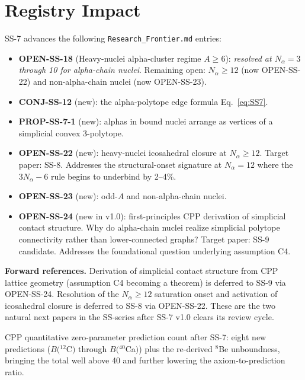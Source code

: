 \documentclass[11pt,letterpaper]{article}
\newcommand{\Nalpha}{N_{\alpha}}
\begin{document}
\section{Registry Impact}
\label{sec:registry}

SS-7 advances the following \texttt{Research\_Frontier.md} entries:
\begin{itemize}
\item \textbf{OPEN-SS-18} (Heavy-nuclei alpha-cluster regime $A \geq 6$): \emph{resolved at $\Nalpha = 3$ through 10 for alpha-chain nuclei}. Remaining open: $\Nalpha \geq 12$ (now OPEN-SS-22) and non-alpha-chain nuclei (now OPEN-SS-23).
\item \textbf{CONJ-SS-12} (new): the alpha-polytope edge formula Eq.~\ref{eq:SS7}.
\item \textbf{PROP-SS-7-1} (new): alphas in bound nuclei arrange as vertices of a simplicial convex 3-polytope.
\item \textbf{OPEN-SS-22} (new): heavy-nuclei icosahedral closure at $\Nalpha \geq 12$. Target paper: SS-8. Addresses the structural-onset signature at $\Nalpha = 12$ where the $3\Nalpha - 6$ rule begins to underbind by 2--4\%.
\item \textbf{OPEN-SS-23} (new): odd-$A$ and non-alpha-chain nuclei.
\item \textbf{OPEN-SS-24} (new in v1.0): first-principles CPP derivation of simplicial contact structure. Why do alpha-chain nuclei realize simplicial polytope connectivity rather than lower-connected graphs? Target paper: SS-9 candidate. Addresses the foundational question underlying assumption C4.
\end{itemize}

\textbf{Forward references.} Derivation of simplicial contact structure from CPP lattice geometry (assumption C4 becoming a theorem) is deferred to SS-9 via OPEN-SS-24. Resolution of the $\Nalpha \geq 12$ saturation onset and activation of icosahedral closure is deferred to SS-8 via OPEN-SS-22. These are the two natural next papers in the SS-series after SS-7 v1.0 clears its review cycle.

CPP quantitative zero-parameter prediction count after SS-7: eight new predictions ($B({}^{12}$C$)$ through $B({}^{40}$Ca$)$) plus the re-derived ${}^8$Be unboundness, bringing the total well above 40 and further lowering the axiom-to-prediction ratio.
\end{document}
